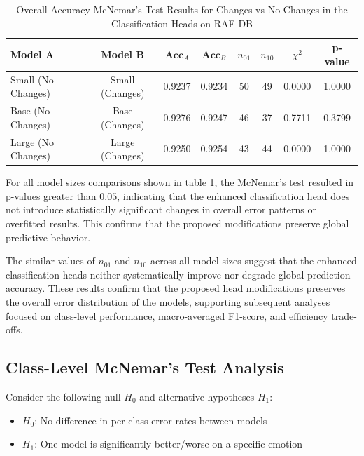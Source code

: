 \begin{table}[h]
\centering
\caption{Overall Accuracy McNemar's Test Results for  Changes vs No Changes in the Classification Heads on RAF-DB}
\label{tab:mcnemar_overall_pairs}
\begin{tabular}{lccccccc}
\hline
\textbf{Model A} & \textbf{Model B} & $\textbf{Acc}_A$ & $\textbf{Acc}_B$ & $n_{01}$ & $n_{10}$ & $\chi^2$ & \textbf{p-value} \\
\hline
Small (No Changes) & Small (Changes) & 0.9237 & 0.9234 & 50 & 49 & 0.0000 & 1.0000 \\
Base (No Changes)  & Base (Changes)  & 0.9276 & 0.9247 & 46 & 37 & 0.7711 & 0.3799 \\
Large (No Changes) & Large (Changes) & 0.9250 & 0.9254 & 43 & 44 & 0.0000 & 1.0000 \\
\end{tabular}
\end{table}


For all model sizes comparisons shown in table \ref{tab:mcnemar_overall_pairs}, the McNemar’s test resulted in p-values greater than $0.05$, indicating that the enhanced classification head does not introduce statistically significant changes in overall error patterns or overfitted results. This confirms that the proposed modifications preserve global predictive behavior.


The similar values of $n_{01}$ and $n_{10}$ across all model sizes suggest that the enhanced classification heads neither systematically improve nor degrade global prediction accuracy. These results confirm that the proposed head modifications preserves the overall error distribution of the models, supporting subsequent analyses focused on class-level performance, macro-averaged F1-score, and efficiency trade-offs.


\subsection{Class-Level McNemar's Test Analysis}
 
Consider the following null $H_0$ and alternative hypotheses $H_1$:

\begin{itemize}
\item $H_0$: No difference in per-class error rates between models
\item $H_1$: One model is significantly better/worse on a specific emotion
\end{itemize}

